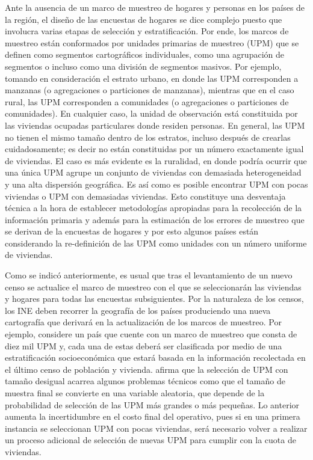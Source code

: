 \documentclass[
  12pt,
]{book}
\begin{document}
Ante la ausencia de un marco de muestreo de hogares y personas en los países de la región, el diseño de las encuestas de hogares se dice complejo puesto que involucra varias etapas de selección y estratificación. Por ende, los marcos de muestreo están conformados por unidades primarias de muestreo (UPM) que se definen como segmentos cartográficos individuales, como una agrupación de segmentos o incluso como una división de segmentos masivos. Por ejemplo, tomando en consideración el estrato urbano, en donde las UPM corresponden a manzanas (o agregaciones o particiones de manzanas), mientras que en el caso rural, las UPM corresponden a comunidades (o agregaciones o particiones de comunidades). En cualquier caso, la unidad de observación está constituida por las viviendas ocupadas particulares donde residen personas. En general, las UPM no tienen el mismo tamaño dentro de los estratos, incluso después de crearlas cuidadosamente; es decir no están constituidas por un número exactamente igual de viviendas. El caso es más evidente es la ruralidad, en donde podría ocurrir que una única UPM agrupe un conjunto de viviendas con demasiada heterogeneidad y una alta dispersión geográfica. Es así como es posible encontrar UPM con pocas viviendas o UPM con demasiadas viviendas. Esto constituye una desventaja técnica a la hora de establecer metodologías apropiadas para la recolección de la información primaria y además para la estimación de los errores de muestreo que se derivan de la encuestas de hogares y por esto algunos países están considerando la re-definición de las UPM como unidades con un número uniforme de viviendas.

Como se indicó anteriormente, es usual que tras el levantamiento de un nuevo censo se actualice el marco de muestreo con el que se seleccionarán las viviendas y hogares para todas las encuestas subsiguientes. Por la naturaleza de los censos, los INE deben recorrer la geografía de los países produciendo una nueva cartografía que derivará en la actualización de los marcos de muestreo. Por ejemplo, considere un país que cuente con un marco de muestreo que consta de diez mil UPM y, cada una de estas deberá ser clasificada por medio de una estratificación socioeconómica que estará basada en la información recolectada en el último censo de población y vivienda. \citet[pág. 183]{Kish_1965} afirma que la selección de UPM con tamaño desigual acarrea algunos problemas técnicos como que el tamaño de muestra final se convierte en una variable aleatoria, que depende de la probabilidad de selección de las UPM más grandes o más pequeñas. Lo anterior aumenta la incertidumbre en el costo final del operativo, pues si en una primera instancia se seleccionan UPM con pocas viviendas, será necesario volver a realizar un proceso adicional de selección de nuevas UPM para cumplir con la cuota de viviendas.
\end{document}
